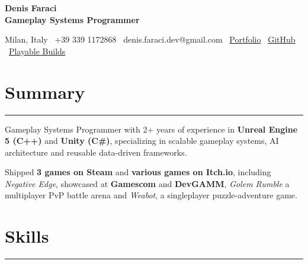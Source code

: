 \documentclass[8.5pt]{article}
\newcommand{\sectionline}{
    \vspace{-2pt}
    \hrule
    \vspace{1pt}
}
\newcommand{\cvsection}[1]{
    \section*{#1}
    \sectionline
}
\begin{document}

    {\Huge\textbf{Denis Faraci}}
    \\
    {\textbf{Gameplay Systems Programmer}}

    Milan, Italy \textbar\
    +39 339 1172868 \textbar\
    denis.faraci.dev@gmail.com \textbar\
    \href{https://zvoyder.github.io}{Portfolio}
    \textbar\
    \href{https://github.com/zvoyder}{GitHub}
    \textbar\
    \href{https://store.steampowered.com/curator/46010347}{Playable Builds}



    \cvsection{Summary}

    Gameplay Systems Programmer with 2+ years of experience in \textbf{Unreal Engine 5 (C++)} and \textbf{Unity (C\#)},
    specializing in scalable gameplay systems, AI architecture and reusable data-driven frameworks.

    Shipped \textbf{3 games on Steam} and \textbf{various games on Itch.io}, including \textit{Negative Edge},
    showcased at \textbf{Gamescom} and \textbf{DevGAMM}, \textit{Golem Rumble} a multiplayer PvP
    battle arena and \textit{Weabot}, a singleplayer puzzle-adventure game.


    \cvsection{Skills}
\end{document}
